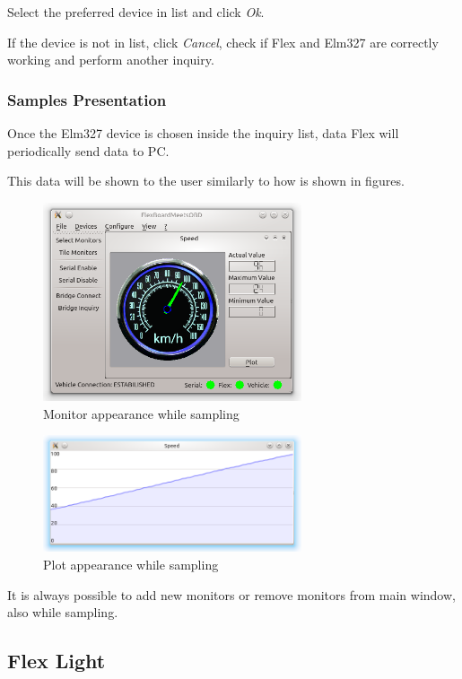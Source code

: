 \documentclass[twoside]{article}
\begin{document}
\begin{multicols}{2}
Select the preferred device in list and click \emph{Ok}.

If the device is not in list, click \emph{Cancel}, check if Flex and Elm327 are correctly working and perform another inquiry.

\subsubsection{Samples Presentation}

Once the Elm327 device is chosen inside the inquiry list, data Flex will periodically send data to PC.

This data will be shown to the user similarly to how is shown in figures.

\begin{figure}[H]
  \centering
  \includegraphics[width=3in]{img/GUI/sampling_monitor}
  \caption{Monitor appearance while sampling}
\end{figure}

\begin{figure}[H]
  \centering
  \includegraphics[width=3in]{img/GUI/sampling_plot}
  \caption{Plot appearance while sampling}
\end{figure}

It is always possible to add new monitors or remove monitors from main window, also while sampling.

\subsection{Flex Light}


\end{multicols}
\end{document}

